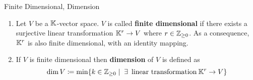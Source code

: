 \begin{definition} {Finite Dimensional, Dimension}
    \begin{enumerate}
        \item Let \(V\) be a \(\mathbb{K}\)-vector space. \(V\) is called \textbf{finite dimensional} if there exists a surjective linear transformation \(\mathbb{K}^r \to V\) where \(r \in \mathbb{Z}_{\geq 0}\). As a consequence, \(\mathbb{K}^r\) is also finite dimensional, with an identity mapping.
        \item If $V$ is finite dimensional then \textbf{dimension} of $V$ is defined as \[\dim V \coloneqq \min\{k \in \bbz_{\geq 0} \mid \exists \:\text{linear transformation}\: \bbk^r \to V\}\]
    \end{enumerate}
\end{definition}